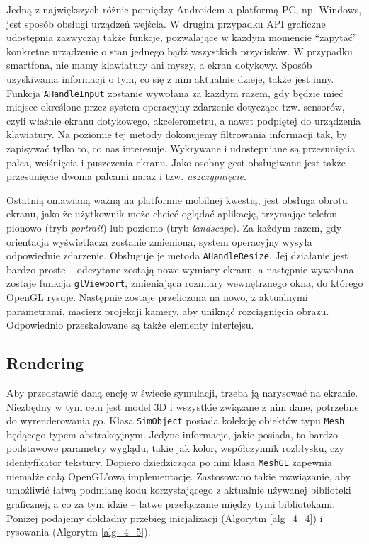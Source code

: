 		Jedną z największych różnic pomiędzy Androidem a platformą PC, np. Windows, jest sposób obsługi urządzeń wejścia. W drugim przypadku API graficzne udostępnia zazwyczaj także funkcje, pozwalające w każdym momencie ``zapytać'' konkretne urządzenie o stan jednego bądź wszystkich przycisków. W przypadku smartfona, nie mamy klawiatury ani myszy, a ekran dotykowy. Sposób uzyskiwania informacji o tym, co się z nim aktualnie dzieje, także jest inny. Funkcja \texttt{AHandleInput} zostanie wywołana za każdym razem, gdy będzie mieć miejsce określone przez system operacyjny zdarzenie dotyczące tzw. sensorów, czyli właśnie ekranu dotykowego, akcelerometru, a nawet podpiętej do urządzenia klawiatury. Na poziomie tej metody dokonujemy filtrowania informacji tak, by zapisywać tylko to, co nas interesuje. Wykrywane i udostępniane są przesunięcia palca, wciśnięcia i puszczenia ekranu. Jako osobny gest obsługiwane jest także przesunięcie dwoma palcami naraz i tzw. \emph{uszczypnięcie}.
		
		Ostatnią omawianą ważną na platformie mobilnej kwestią, jest obsługa obrotu ekranu, jako że użytkownik może chcieć oglądać aplikację, trzymając telefon pionowo (tryb \emph{portrait}) lub poziomo (tryb \emph{landscape}). Za każdym razem, gdy orientacja wyświetlacza zostanie zmieniona, system operacyjny wysyła odpowiednie zdarzenie. Obsługuje je metoda \texttt{AHandleResize}. Jej działanie jest bardzo proste -- odczytane zostają nowe wymiary ekranu, a następnie wywołana zostaje funkcja \texttt{glViewport}, zmieniająca rozmiary wewnętrznego okna, do którego OpenGL rysuje. Następnie zostaje przeliczona na nowo, z aktualnymi parametrami, macierz projekcji kamery, aby uniknąć rozciągnięcia obrazu. Odpowiednio przeskalowane są także elementy interfejsu.
		
		\subsection{Rendering}
		\label{t:praktyka:silnik:render}
		
		
		Aby przedstawić daną encję w świecie symulacji, trzeba ją narysować na ekranie. Niezbędny w tym celu jest model 3D i wszystkie związane z nim dane, potrzebne do wyrenderowania go. Klasa \texttt{SimObject} posiada kolekcję obiektów typu \texttt{Mesh}, będącego typem abstrakcyjnym. Jedyne informacje, jakie posiada, to bardzo podstawowe parametry wyglądu, takie jak kolor, współczynnik rozbłysku, czy identyfikator tekstury. Dopiero dziedzicząca po nim klasa \texttt{MeshGL} zapewnia niemalże całą OpenGL'ową implementację. Zastosowano takie rozwiązanie, aby umożliwić łatwą podmianę kodu korzystającego z aktualnie używanej biblioteki graficznej, a co za tym idzie -- łatwe przełączanie między tymi bibliotekami. Poniżej podajemy dokładny przebieg inicjalizacji (Algorytm \ref{alg_4_4}) i rysowania (Algorytm \ref{alg_4_5}).
		
